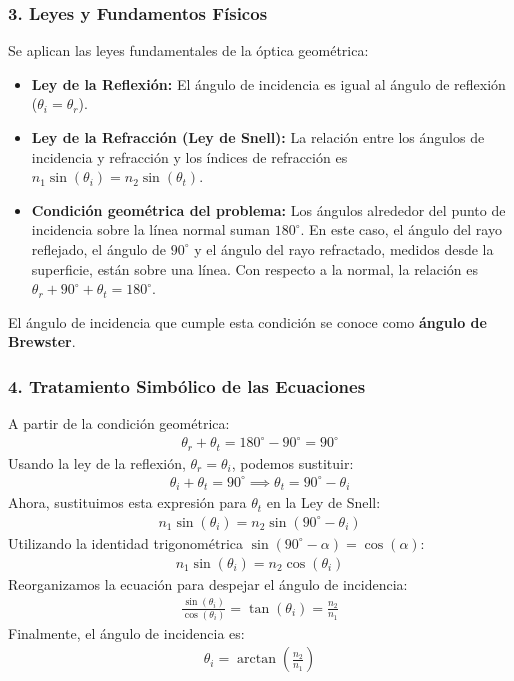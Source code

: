 \subsubsection*{3. Leyes y Fundamentos Físicos}
Se aplican las leyes fundamentales de la óptica geométrica:
\begin{itemize}
    \item \textbf{Ley de la Reflexión:} El ángulo de incidencia es igual al ángulo de reflexión ($\theta_i = \theta_r$).
    \item \textbf{Ley de la Refracción (Ley de Snell):} La relación entre los ángulos de incidencia y refracción y los índices de refracción es $n_1 \sin(\theta_i) = n_2 \sin(\theta_t)$.
    \item \textbf{Condición geométrica del problema:} Los ángulos alrededor del punto de incidencia sobre la línea normal suman $180^\circ$. En este caso, el ángulo del rayo reflejado, el ángulo de $90^\circ$ y el ángulo del rayo refractado, medidos desde la superficie, están sobre una línea. Con respecto a la normal, la relación es $\theta_r + 90^\circ + \theta_t = 180^\circ$.
\end{itemize}
El ángulo de incidencia que cumple esta condición se conoce como \textbf{ángulo de Brewster}.

\subsubsection*{4. Tratamiento Simbólico de las Ecuaciones}
A partir de la condición geométrica:
\begin{gather}
    \theta_r + \theta_t = 180^\circ - 90^\circ = 90^\circ
\end{gather}
Usando la ley de la reflexión, $\theta_r = \theta_i$, podemos sustituir:
\begin{gather}
    \theta_i + \theta_t = 90^\circ \implies \theta_t = 90^\circ - \theta_i
\end{gather}
Ahora, sustituimos esta expresión para $\theta_t$ en la Ley de Snell:
\begin{gather}
    n_1 \sin(\theta_i) = n_2 \sin(90^\circ - \theta_i)
\end{gather}
Utilizando la identidad trigonométrica $\sin(90^\circ - \alpha) = \cos(\alpha)$:
\begin{gather}
    n_1 \sin(\theta_i) = n_2 \cos(\theta_i)
\end{gather}
Reorganizamos la ecuación para despejar el ángulo de incidencia:
\begin{gather}
    \frac{\sin(\theta_i)}{\cos(\theta_i)} = \tan(\theta_i) = \frac{n_2}{n_1}
\end{gather}
Finalmente, el ángulo de incidencia es:
\begin{gather}
    \theta_i = \arctan\left(\frac{n_2}{n_1}\right)
\end{gather}

